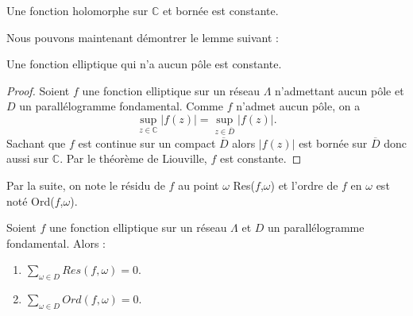 \documentclass[a4paper]{article}
\begin{document}
\begin{theorem}\label{liou}
Une fonction holomorphe sur $\mathbb{C}$ et bornée est constante.
\end{theorem}
\noindent Nous pouvons maintenant démontrer le lemme suivant :
\begin{lem} \label{lemm1}
Une fonction elliptique qui n'a aucun pôle est constante.
\end{lem} 
\begin{proof}
Soient $f$ une fonction elliptique sur un réseau $\Lambda$ n'admettant aucun pôle et $D$  un parallélogramme fondamental. Comme $f$ n'admet aucun pôle, on a 
\begin{equation*}
\underset{z \in \mathbb{C}} \sup |f(z)|=\underset{z \in \overline{D}}\sup |f(z)|.
\end{equation*}
Sachant que $f$ est continue sur un compact $\overline{D}$ alors $|f(z)|$ est bornée sur $\overline{D}$ donc aussi sur $\mathbb{C}$. Par le théorème de Liouville, $f$ est constante.
\end{proof}


\noindent Par la suite, on note le résidu de $f$ au point $\omega$ Res($f$,$\omega$) et l'ordre de $f$ en $\omega$ est noté Ord($f$,$\omega$).


\begin{theorem} \label{theo2}
 Soient $f$ une fonction elliptique sur un réseau $\Lambda$ et $D$  un parallélogramme fondamental. Alors :
\begin{enumerate}
\item $\sum \limits_{\omega \in D} Res(f,\omega) = 0$.
\item $\sum \limits_{\omega \in D} Ord(f,\omega) = 0$.
\end{enumerate}
\end{theorem}
\end{document}
